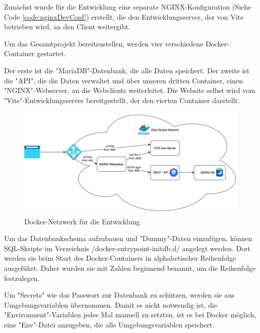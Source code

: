 
Zunächst wurde für die Entwicklung eine separate NGINX-Konfiguration (Siehe Code \ref{code:nginxDevConf}) erstellt, die den Entwicklungsserver, der von Vite betrieben wird, an den Client weitergibt.


Um das Gesamtprojekt bereitzustellen, werden vier verschiedene Docker-Container gestartet.

Der erste ist die "MariaDB"-Datenbank, die alle Daten speichert. Der zweite ist die "API", die die Daten verwaltet und über unseren dritten Container, einen "NGINX"-Webserver, an die Webclients weiterleitet. Die Website selbst wird vom "Vite"-Entwicklungsserver bereitgestellt, der den vierten Container darstellt. 

\begin{figure}[H]
    \centering
    \includegraphics{media/Docker/DevNetwork.png}
    \caption{Docker-Netzwerk für die Entwicklung}
\end{figure}

Um das Datenbankschema aufzubauen und "Dummy"-Daten einzufügen, können SQL-Skripte im Verzeichnis /docker-entrypoint-initdb.d/ angelegt werden. Dort werden sie beim Start des Docker-Containers in alphabetischer Reihenfolge ausgeführt. Daher wurden sie mit Zahlen beginnend benannt, um die Reihenfolge festzulegen.

Um "Secrets" wie das Passwort zur Datenbank zu schützen, werden sie aus Umgebungsvariablen übernommen. Damit es nicht notwendig ist, die "Environment"-Variablen jedes Mal manuell zu setzten, ist es bei Docker möglich, eine "Env"-Datei anzugeben, die alle Umgebungsvariablen speichert. 

